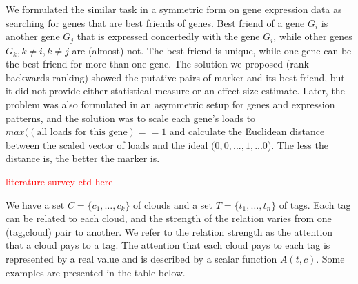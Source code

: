 \documentclass{llncs}
\begin{document}
We formulated \cite{best_friends:2015} the similar task in a symmetric form on gene expression data as searching for genes that are best friends of genes. Best friend of a gene $G_i$ is another gene $G_j$ that is expressed concertedly with the gene $G_i$, while other genes $G_k, k\neq i, k \neq j$ are (almost) not. The best friend is unique, while one gene can be the best friend for more than one gene. The solution we proposed (rank backwards ranking) showed the putative pairs of marker and its best friend, but it did not provide either statistical measure or an effect size estimate. Later, the problem was also formulated in an asymmetric setup \cite{patternmarkers:2017} for genes and expression patterns, and the solution was to scale each gene's loads to $max((\mbox{all loads for this gene})==1$ and calculate the Euclidean distance between the scaled vector of loads and the ideal $(0,0,...,1,...0$). The less the distance is, the better the marker is. 

\textcolor{red}{literature survey ctd here}



We have a set $C = \{c_1, \dots, c_k\}$ of clouds %
and a set $T = \{t_1, \dots, t_n\}$ of tags. Each tag can be related to each cloud, and the strength of the relation varies from one (tag,cloud) pair to another. We refer to the relation strength as the attention that a cloud pays to a tag. The attention that each cloud pays to each tag is represented by a real value and is described by a scalar function $A(t, c)$. Some examples are presented in the table below.

\end{document}
